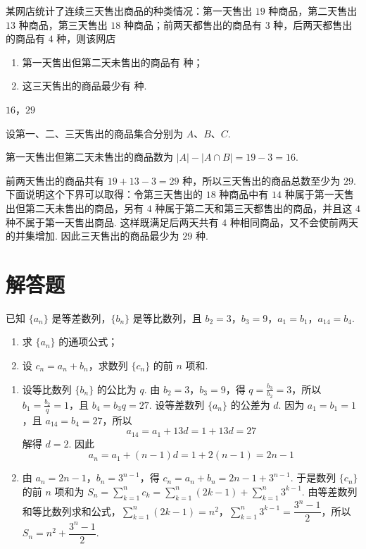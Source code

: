 \begin{problem}
某网店统计了连续三天售出商品的种类情况：第一天售出 \(19\) 种商品，第二天售出 \(13\) 种商品，第三天售出 \(18\) 种商品；前两天都售出的商品有 \(3\) 种，后两天都售出的商品有 \(4\) 种，则该网店

\begin{enumerate}
\item 第一天售出但第二天未售出的商品有\fillinblank{} 种；
\item 这三天售出的商品最少有\fillinblank{} 种.
\end{enumerate}
\end{problem}

\begin{answer}
\(16\)，\(29\)
\end{answer}

\begin{solution}
设第一、二、三天售出的商品集合分别为 \(A\)、\(B\)、\(C\).

第一天售出但第二天未售出的商品数为 \(|A|-|A\cap B|=19-3=16\).

前两天售出的商品共有 \(19+13-3=29\) 种，所以三天售出的商品总数至少为 \(29\). 下面说明这个下界可以取得：令第三天售出的 \(18\) 种商品中有 \(14\) 种属于第一天售出但第二天未售出的商品，另有 \(4\) 种属于第二天和第三天都售出的商品，并且这 \(4\) 种不属于第一天售出商品. 这样既满足后两天共有 \(4\) 种相同商品，又不会使前两天的并集增加. 因此三天售出的商品最少为 \(29\) 种.
\end{solution}

\section{解答题}

\begin{problem}
已知 \(\{a_n\}\) 是等差数列，\(\{b_n\}\) 是等比数列，且 \(b_2=3\)，\(b_3=9\)，\(a_1=b_1\)，\(a_{14}=b_4\).

\begin{enumerate}
\item 求 \(\{a_n\}\) 的通项公式；
\item 设 \(c_n=a_n+b_n\)，求数列 \(\{c_n\}\) 的前 \(n\) 项和.
\end{enumerate}
\end{problem}

\begin{solution}
\begin{enumerate}
\item 设等比数列 \(\{b_n\}\) 的公比为 \(q\). 由 \(b_2=3\)，\(b_3=9\)，得 \(q=\frac{b_3}{b_2}=3\)，所以 \(b_1=\frac{b_2}{q}=1\)，且 \(b_4=b_3q=27\).
设等差数列 \(\{a_n\}\) 的公差为 \(d\). 因为 \(a_1=b_1=1\)，且 \(a_{14}=b_4=27\)，所以
\[
a_{14}=a_1+13d=1+13d=27
\]
解得 \(d=2\). 因此
\[
a_n=a_1+(n-1)d=1+2(n-1)=2n-1
\]

\item 由 \(a_n=2n-1\)，\(b_n=3^{n-1}\)，得
\(c_n=a_n+b_n=2n-1+3^{n-1}\).
于是数列 \(\{c_n\}\) 的前 \(n\) 项和为 \(S_n=\sum_{k=1}^{n}c_k=\sum_{k=1}^{n}(2k-1)+\sum_{k=1}^{n}3^{k-1}\). 由等差数列和等比数列求和公式，\(\sum_{k=1}^{n}(2k-1)=n^2\)，\(\sum_{k=1}^{n}3^{k-1}=\dfrac{3^n-1}{2}\)，所以 \(S_n=n^2+\dfrac{3^n-1}{2}\).
\end{enumerate}
\end{solution}

